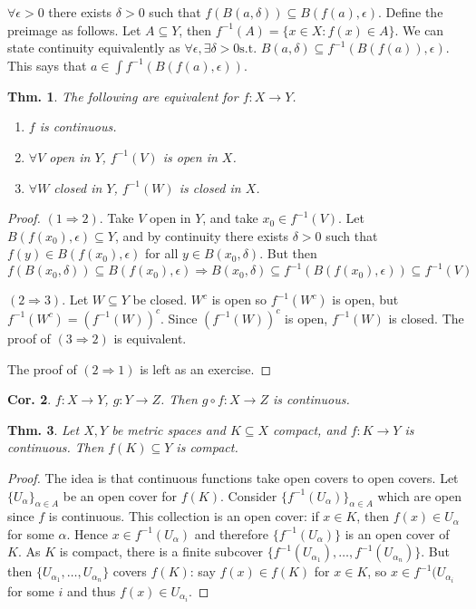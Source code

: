 \documentclass[12pt, a4paper]{book}
\newcommand{\st}{\text{s.t. }}
\newtheorem{theorem}{Thm.}[section]
\newtheorem{corollary}[theorem]{Cor.}
\theoremstyle{nonumberplain}
\newtheorem{proof}{Proof}
\begin{document}
$\forall\epsilon>0$ there exists $\delta>0$ such that $f(B(a,\delta))\subseteq B(f(a),\epsilon)$. Define the preimage
as follows. Let $A\subseteq Y$, then $f^{-1}(A)=\{x\in X:f(x)\in A\}$. We can state continuity equivalently as
$\forall\epsilon,\exists\delta>0\st B(a,\delta)\subseteq f^{-1}(B(f(a)),\epsilon)$. This says that $a\in\int f^{-1}(B(f(a),\epsilon))$.
\begin{theorem}
    The following are equivalent for $f:X\to Y$.
    \begin{enumerate}
        \item $f$ is continuous.
        \item $\forall V$ open in $Y$, $f^{-1}(V)$ is open in $X$.
        \item $\forall W$ closed in $Y$, $f^{-1}(W)$ is closed in $X$.
    \end{enumerate}
\end{theorem}
\begin{proof}
    $(1\Rightarrow 2)$. Take $V$ open in $Y$, and take $x_0\in f^{-1}(V)$. Let $B(f(x_0),\epsilon)\subseteq Y$, and
    by continuity there exists $\delta>0$ such that $f(y)\in B(f(x_0),\epsilon)$ for all $y\in B(x_0,\delta)$. But then
    $f(B(x_0,\delta))\subseteq B(f(x_0),\epsilon)\Rightarrow B(x_0,\delta)\subseteq f^{-1}(B(f(x_0),\epsilon))\subseteq f^{-1}(V)$

    $(2\Rightarrow 3)$. Let $W\subseteq Y$ be closed. $W^c$ is open so $f^{-1}(W^c)$ is open, but $f^{-1}(W^c)=(f^{-1}(W))^c$.
    Since $(f^{-1}(W))^c$ is open, $f^{-1}(W)$ is closed. The proof of $(3\Rightarrow 2)$ is equivalent.

    The proof of $(2\Rightarrow 1)$ is left as an exercise.
\end{proof}
\begin{corollary}
    $f:X\to Y$, $g:Y\to Z$. Then $g\circ f:X\to Z$ is continuous.
\end{corollary}
\begin{theorem}
    Let $X,Y$ be metric spaces and $K\subseteq X$ compact, and $f:K\to Y$ is continuous. Then $f(K)\subseteq Y$ is compact.
\end{theorem}
\begin{proof}
    The idea is that continuous functions take open covers to open covers. Let $\{U_\alpha\}_{\alpha\in A}$ be an open
    cover for $f(K)$. Consider $\{f^{-1}(U_\alpha)\}_{\alpha\in A}$ which are open since $f$ is continuous. This collection
    is an open cover: if $x\in K$, then $f(x)\in U_\alpha$ for some $\alpha$. Hence $x\in f^{-1}(U_\alpha)$ and therefore
    $\{f^{-1}(U_\alpha)\}$ is an open cover of $K$. As $K$ is compact, there is a finite subcover $\{f^{-1}(U_{\alpha_1}),\ldots,f^{-1}(U_{\alpha_n})\}$.
    But then $\{U_{\alpha_1},\ldots,U_{\alpha_n}\}$ covers $f(K)$: say $f(x)\in f(K)$ for $x\in K$, so $x\in f^{-1}(U_{\alpha_i}$
    for some $i$ and thus $f(x)\in U_{\alpha_i}$.
\end{proof}
\end{document}

